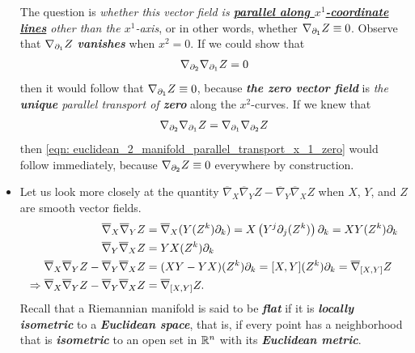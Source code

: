 \documentclass[11pt]{article}
\begin{document}
\begin{itemize}
\begin{remark}
The question is \emph{whether this vector field is \underline{\textbf{parallel along $x^1$-coordinate lines}} other than the $x^1$-axis}, or in other words, whether $\nabla_{\partial_1}{Z} \equiv 0$. Observe that $\nabla_{\partial_1}{Z}$ \emph{\textbf{vanishes}} when $x^2 = 0$. If we could show that
\begin{align}
\nabla_{\partial_2}{\nabla_{\partial_1}{Z}} = 0 \label{eqn: euclidean_2_manifold_parallel_transport_x_1_zero}
\end{align} then it would follow that $\nabla_{\partial_1}{Z} \equiv 0$, because \emph{\textbf{the zero vector field}} is \emph{the \textbf{unique} parallel transport of \textbf{zero}} along the $x^2$-curves. If we knew that
\begin{align}
\nabla_{\partial_2}{\nabla_{\partial_1}{Z}} = \nabla_{\partial_1}{\nabla_{\partial_2}{Z}} \label{eqn: euclidean_2_manifold_parallel_transport_x_1_x_2}
\end{align}
then \eqref{eqn: euclidean_2_manifold_parallel_transport_x_1_zero} would follow immediately, because $\nabla_{\partial_2}{Z} \equiv 0$ everywhere by construction. 
\end{remark}

\item \begin{remark}
Let us look more closely at the quantity $\overline{\nabla}_{X}{\overline{\nabla}_{Y}}Z  - \overline{\nabla}_{Y}{\overline{\nabla}_{X}}Z$ when $X$, $Y$, and $Z$ are smooth vector fields.
\begin{align*}
\overline{\nabla}_{X}{\overline{\nabla}_{Y}}Z &= \overline{\nabla}_{X}{(Y(Z^k)\partial_k)} = X\left(Y^{j} \partial_j(Z^k)\right)\partial_k= XY(Z^k)\partial_k\\
\overline{\nabla}_{Y}{\overline{\nabla}_{X}}Z &= YX(Z^k)\partial_k\\
\overline{\nabla}_{X}{\overline{\nabla}_{Y}}Z  - \overline{\nabla}_{Y}{\overline{\nabla}_{X}}Z &= (XY - YX)(Z^k)\partial_k = [X, Y](Z^k)\partial_k = \overline{\nabla}_{[X, Y]}{Z}\\
\Rightarrow \overline{\nabla}_{X}{\overline{\nabla}_{Y}}Z  - \overline{\nabla}_{Y}{\overline{\nabla}_{X}}Z &=\overline{\nabla}_{[X, Y]}{Z}.
\end{align*} Recall that a Riemannian manifold is said to be \emph{\textbf{flat}} if it is \emph{\textbf{locally isometric}} to a \emph{\textbf{Euclidean space}}, that is, if every point has a neighborhood that is \emph{\textbf{isometric}} to an open set in ${\mathbb R}^n$ with its \emph{\textbf{Euclidean metric}}. 


\end{remark}
\end{itemize}
\end{document}
